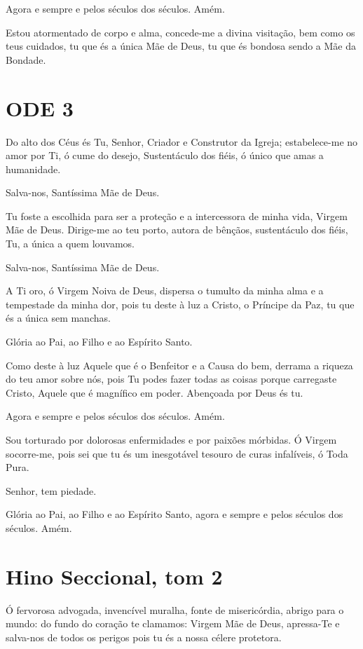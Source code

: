 \documentclass{subfiles}
\begin{document}
Agora e sempre e pelos séculos dos séculos. Amém.

Estou atormentado de corpo e alma, concede-me a divina visitação,
bem como os teus cuidados, tu que és a única Mãe de Deus, tu que és bondosa
sendo a Mãe da Bondade.

\section*{ODE 3}

\eirmos{}Do alto dos Céus és Tu, Senhor, Criador e Construtor da Igreja;
estabelece-me no amor por Ti, ó cume do desejo, Sustentáculo dos fiéis, ó
único que amas a humanidade.

Salva-nos, Santíssima Mãe de Deus.

Tu foste a escolhida para ser a proteção e a intercessora de minha vida,
Virgem Mãe de Deus. Dirige-me ao teu porto, autora de bênçãos, sustentáculo
dos fiéis, Tu, a única a quem louvamos.

Salva-nos, Santíssima Mãe de Deus.

A Ti oro, ó Virgem Noiva de Deus, dispersa o tumulto da minha alma e
a tempestade da minha dor, pois tu deste à luz a Cristo, o Príncipe da Paz, tu
que és a única sem manchas.

Glória ao Pai, ao Filho e ao Espírito Santo.

Como deste à luz Aquele que é o Benfeitor e a Causa do bem, derrama
a riqueza do teu amor sobre nós, pois Tu podes fazer todas as coisas porque
carregaste Cristo, Aquele que é magnífico em poder. Abençoada por Deus és
tu.

Agora e sempre e pelos séculos dos séculos. Amém.

Sou torturado por dolorosas enfermidades e por paixões mórbidas. Ó
Virgem socorre-me, pois sei que tu és um inesgotável tesouro de curas
infalíveis, ó Toda Pura.

Senhor, tem piedade. 

Glória ao Pai, ao Filho e ao Espírito Santo, agora e sempre e pelos
séculos dos séculos. Amém.

\section*{Hino Seccional, tom 2}

Ó fervorosa advogada, invencível muralha, fonte de misericórdia, abrigo para o
mundo: do fundo do coração te clamamos: Virgem Mãe de Deus, apressa-Te e
salva-nos de todos os perigos pois tu és a nossa célere protetora.
\end{document}
